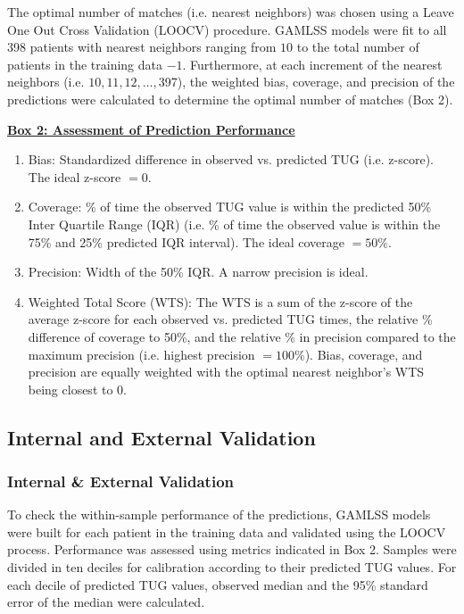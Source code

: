 \documentclass[fleqn,10pt]{wlscirep}\usepackage{knitr}
\begin{document}
The optimal number of matches (i.e. nearest neighbors) was chosen using a Leave One Out Cross Validation (LOOCV) procedure. GAMLSS models were fit to all 398 patients with nearest neighbors ranging from $10$ to the total number of patients in the training data $-1$. Furthermore, at each increment of the nearest neighbors (i.e. $10, 11, 12, \dots,$397), the weighted bias, coverage, and precision of the predictions were calculated to determine the optimal number of matches (Box 2).


\begin{tcolorbox}
    \underline{\textbf{Box 2: Assessment of Prediction Performance}}
    \begin{enumerate}
        \setlength{\itemsep}{1pt}
        \setlength{\parskip}{0pt}
        \setlength{\parsep}{0pt}
        \item Bias: Standardized difference in observed vs. predicted TUG (i.e. z-score). The ideal z-score $= 0$.
        \item Coverage: \% of time the observed TUG value is within the predicted 50\% Inter Quartile Range (IQR) (i.e. \% of time the observed value is within the 75\% and 25\% predicted IQR interval). The ideal coverage $= 50\%$. 
        \item Precision: Width of the 50\% IQR. A narrow precision is ideal.
        \item Weighted Total Score (WTS): The WTS is a sum of the z-score of the average z-score for each observed vs. predicted TUG times, the relative \% difference of coverage to 50\%, and the relative \% in precision compared to the maximum precision (i.e. highest precision $= 100\%$). Bias, coverage, and precision are equally weighted with the optimal nearest neighbor's WTS being closest to $0$. 
    \end{enumerate}
\end{tcolorbox}


\subsection*{Internal and External Validation}

\subsubsection*{Internal \& External Validation}

To check the within-sample performance of the predictions, GAMLSS models were built for each patient in the training data and validated using the LOOCV process. Performance was assessed using metrics indicated in Box 2. Samples were divided in ten deciles for calibration according to their predicted TUG values. For each decile of predicted TUG values, observed median and the 95\% standard error of the median were calculated.
\end{document}
